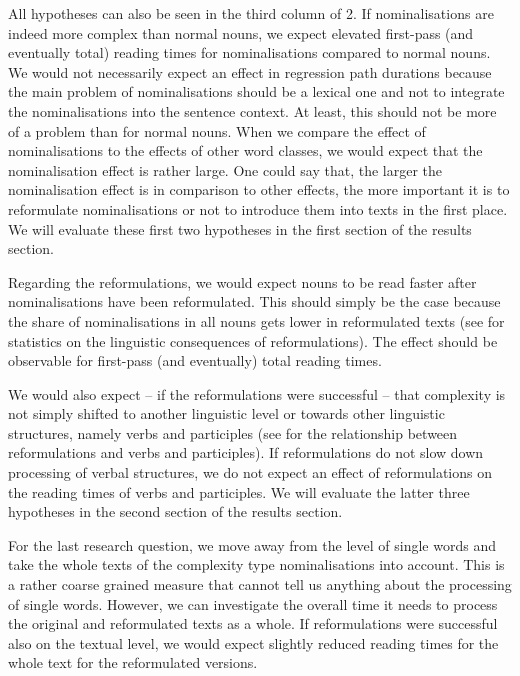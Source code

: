 \documentclass[output=paper]{langsci/langscibook}
\begin{document}
All hypotheses can also be seen in the third column of 2. If nominalisations are indeed more complex than normal nouns, we expect elevated first-pass (and eventually total) reading times for nominalisations compared to normal nouns. We would not necessarily expect an effect in regression path durations because the main problem of nominalisations should be a lexical one and not to integrate the nominalisations into the sentence context. At least, this should not be more of a problem than for normal nouns. When we compare the effect of nominalisations to the effects of other word classes, we would expect that the nominalisation effect is rather large. One could say that, the larger the nominalisation effect is in comparison to other effects, the more important it is to reformulate nominalisations or not to introduce them into texts in the first place. We will evaluate these first two hypotheses in the first section of the results section.

Regarding the reformulations, we would expect nouns to be read faster after nominalisations have been reformulated. This should simply be the case because the share of nominalisations in all nouns gets lower in reformulated texts (see  for statistics on the linguistic consequences of reformulations). The effect should be observable for first-pass (and eventually) total reading times.

We would also expect – if the reformulations were successful – that complexity is not simply shifted to another linguistic level or towards other linguistic structures, namely verbs and participles (see  for the relationship between reformulations and verbs and participles). If reformulations do not slow down processing of verbal structures, we do not expect an effect of reformulations on the reading times of verbs and participles. We will evaluate the latter three hypotheses in the second section of the results section.

For the last research question, we move away from the level of single words and take the whole texts of the complexity type nominalisations into account. This is a rather coarse grained measure that cannot tell us anything about the processing of single words. However, we can investigate the overall time it needs to process the original and reformulated texts as a whole. If reformulations were successful also on the textual level, we would expect slightly reduced reading times for the whole text for the reformulated versions.
\end{document}
